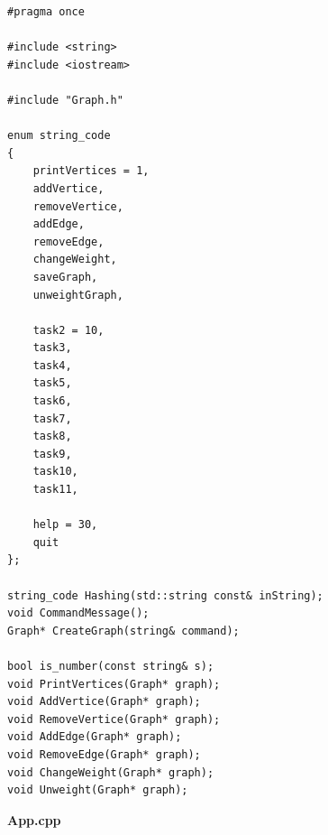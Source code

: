 \documentclass[otchet]{SCWorks}
\begin{document}
\begin{verbatim}
#pragma once

#include <string>
#include <iostream>

#include "Graph.h"

enum string_code
{
	printVertices = 1,
	addVertice,
	removeVertice,
	addEdge,
	removeEdge,
	changeWeight,
	saveGraph,
	unweightGraph,

	task2 = 10,
	task3,
	task4,
	task5,
	task6,
	task7,
	task8,
	task9,
	task10,
	task11,

	help = 30,
	quit
};

string_code Hashing(std::string const& inString);
void CommandMessage();
Graph* CreateGraph(string& command);

bool is_number(const string& s);
void PrintVertices(Graph* graph);
void AddVertice(Graph* graph);
void RemoveVertice(Graph* graph);
void AddEdge(Graph* graph);
void RemoveEdge(Graph* graph);
void ChangeWeight(Graph* graph);
void Unweight(Graph* graph);
\end{verbatim}

\textbf{App.cpp}
\end{document}
